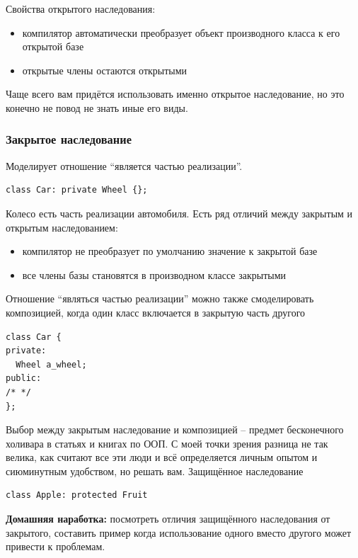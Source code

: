 \documentclass[a4paper,12pt,oneside]{article}
\begin{document}
Свойства открытого наследования:
\begin{itemize}
\item
компилятор автоматически преобразует объект производного класса к его открытой базе
\item
открытые члены остаются открытыми
\end{itemize}

Чаще всего вам придётся использовать именно открытое наследование, но это конечно не повод не знать иные его виды.

\subsubsection{Закрытое наследование}

Моделирует отношение ``является частью реализации''.

\begin{lstlisting}
class Car: private Wheel {};
\end{lstlisting}

Колесо есть часть реализации автомобиля. Есть ряд отличий между закрытым и открытым наследованием: 

\begin{itemize}
\item
компилятор не преобразует по умолчанию значение к закрытой базе
\item
все члены базы становятся в производном классе закрытыми
\end{itemize}

Отношение ``являться частью реализации'' можно также смоделировать композицией, когда один класс включается в закрытую часть другого

\begin{lstlisting}
class Car {
private:
  Wheel a_wheel;
public:
/* */
};
\end{lstlisting}

Выбор между закрытым наследование и композицией – предмет бесконечного холивара в статьях и книгах по ООП. С моей точки зрения разница не так велика, как считают все эти люди и всё определяется личным опытом и сиюминутным удобством, но решать вам.
Защищённое наследование 

\begin{lstlisting}
class Apple: protected Fruit
\end{lstlisting}

\textbf{Домашняя наработка:} посмотреть отличия защищённого наследования от закрытого, составить пример когда использование одного вместо другого может привести к проблемам.
\end{document}
